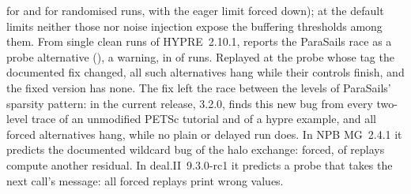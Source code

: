 \begin{itemize}[leftmargin=*]
  \MBIfoneMUST for \MUST and \MBIfonestress for randomised runs, \MBIfonestresseager with the eager
  limit forced down); at the default limits neither those nor noise injection expose the
  \nMBItpPredBuf buffering thresholds among them. From single clean runs of HYPRE~2.10.1, \tool reports the ParaSails race as a probe
  alternative (\Lone), a warning, in \nHypreExposed of \nHypreTraced runs. Replayed at the
  probe whose tag the documented fix changed, all \nHypreCrossAlts such alternatives hang while their
  controls finish, and the fixed version has none. The fix left the race between the levels of
  ParaSails' sparsity pattern: in the current release, 3.2.0, \tool finds this new bug from every
  two-level trace of an unmodified PETSc tutorial and of a hypre example, and all
  \nHypreNewAllCrossAlts forced alternatives hang, while no plain or delayed run does.
  In NPB MG~2.4.1 it predicts the documented wildcard bug of the halo exchange: forced,
  \nMGChanged of \nMGReplayed replays compute another residual. In deal.II~9.3.0-rc1 it predicts
  a probe that takes the next call's message: all \nDealReplayed forced replays print wrong values.
\end{itemize}
